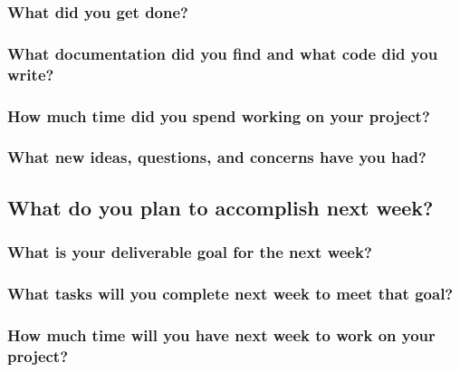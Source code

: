 \documentclass[letterpaper]{article}            %
\begin{document}
\subsubsection{What did you get done?}



\subsubsection{What documentation did you find and what code did you write?}



\subsubsection{How much time did you spend working on your project?}



\subsubsection{What new ideas, questions, and concerns have you had?}




\subsection{What do you plan to accomplish next week?}

\subsubsection{What is your deliverable goal for the next week?}



\subsubsection{What tasks will you complete next week to meet that goal?}



\subsubsection{How much time will you have next week to work on your project?}



\end{document}
